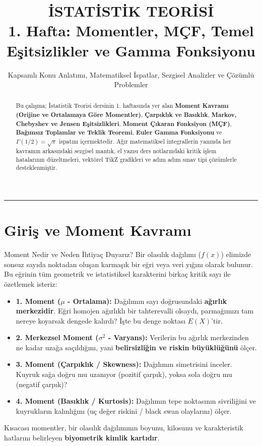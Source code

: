 \documentclass[12pt,a4paper]{article}
\title{\textbf{İSTATİSTİK TEORİSİ}\\[0.3em] \Large 1. Hafta: Momentler, MÇF, Temel Eşitsizlikler ve Gamma Fonksiyonu}
\author{Kapsamlı Konu Anlatımı, Matematiksel İspatlar, Sezgisel Analizler ve Çözümlü Problemler}
\date{}
\begin{document}
\maketitle

\begin{abstract}
Bu çalışma; İstatistik Teorisi dersinin 1. haftasında yer alan \textbf{Moment Kavramı (Orijine ve Ortalamaya Göre Momentler)}, \textbf{Çarpıklık ve Basıklık}, \textbf{Markov, Chebyshev ve Jensen Eşitsizlikleri}, \textbf{Moment Çıkaran Fonksiyon (MÇF)}, \textbf{Bağımsız Toplamlar ve Teklik Teoremi}, \textbf{Euler Gamma Fonksiyonu} ve $\Gamma(1/2) = \sqrt{\pi}$ ispatını içermektedir. Ağır matematiksel integrallerin yanında her kavramın arkasındaki sezgisel mantık, el yazısı ders notlarındaki kritik işlem hatalarının düzeltmeleri, vektörel TikZ grafikleri ve adım adım sınav tipi çözümlerle desteklenmiştir.
\end{abstract}

\hrule
\vspace{1em}

\section{Giriş ve Moment Kavramı}

\begin{sezgi}{Moment Nedir ve Neden İhtiyaç Duyarız?}
Bir olasılık dağılımı ($f(x)$) elimizde sonsuz sayıda noktadan oluşan karmaşık bir eğri veya veri yığını olarak bulunur. Bu eğrinin tüm geometrik ve istatistiksel karakterini birkaç kritik sayı ile özetlemek isteriz:
\begin{itemize}
    \item \textbf{1. Moment ($\mu$ - Ortalama):} Dağılımın sayı doğrusundaki \textbf{ağırlık merkezidir}. Eğri homojen ağırlıklı bir tahterevalli olsaydı, parmağımızı tam nereye koyarsak dengede kalırdı? İşte bu denge noktası $E(X)$'tir.
    \item \textbf{2. Merkezsel Moment ($\sigma^2$ - Varyans):} Verilerin bu ağırlık merkezinden ne kadar uzağa saçıldığını, yani \textbf{belirsizliğin ve riskin büyüklüğünü} ölçer.
    \item \textbf{3. Moment (Çarpıklık / Skewness):} Dağılımın simetrisini inceler. Kuyruk sağa doğru mu uzanıyor (pozitif çarpık), yoksa sola doğru mu (negatif çarpık)?
    \item \textbf{4. Moment (Basıklık / Kurtosis):} Dağılımın tepe noktasının sivriliğini ve kuyrukların kalınlığını (uç değer riskini / black swan olaylarını) ölçer.
\end{itemize}
Kısacası momentler, bir olasılık dağılımının boyunu, kilosunu ve karakteristik hatlarını belirleyen \textbf{biyometrik kimlik kartıdır}.
\end{sezgi}
\end{document}
